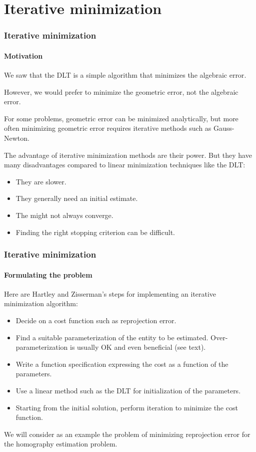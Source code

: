 \documentclass[aspectratio=169]{beamer}
\begin{document}
\section{Iterative minimization}

\begin{frame}
\frametitle{Iterative minimization}
\framesubtitle{Motivation}

We saw that the DLT is a simple algorithm that minimizes the
\alert{algebraic error}.

\medskip

However, we would prefer to minimize the \alert{geometric error}, not
the algebraic error.

\medskip

For some problems, geometric error can be minimized analytically, but
more often minimizing geometric error requires \alert{iterative
methods} such as Gauss-Newton.

\medskip

The advantage of iterative minimization methods are their power.  But
they have many disadvantages compared to linear minimization
techniques like the DLT:
\begin{itemize}
\item They are \alert{slower}.
\item They generally need an \alert{initial estimate}.
\item The \alert{might not always converge}.
\item Finding the right \alert{stopping criterion} can be difficult.
\end{itemize}

\end{frame}

\begin{frame}
\frametitle{Iterative minimization}
\framesubtitle{Formulating the problem}

Here are Hartley and Zisserman's steps for implementing an iterative
minimization algorithm:
\begin{itemize}
\item Decide on a \alert{cost function} such as reprojection error.
\item Find a suitable \alert{parameterization} of the entity to be
  estimated.  Over-parameterization is usually OK and even beneficial
  (see text).
\item Write a \alert{function specification} expressing the cost as a
  function of the parameters.
\item Use a linear method such as the DLT for \alert{initialization}
  of the parameters.
\item Starting from the initial solution, perform \alert{iteration} to
  minimize the cost function.
\end{itemize}

We will consider as an example the problem of minimizing
reprojection error for the homography estimation problem.

\end{frame}
\end{document}
